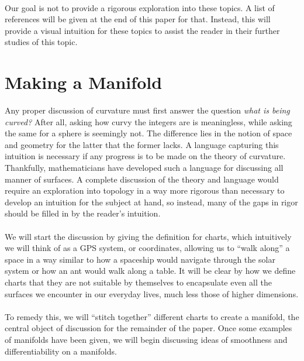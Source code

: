 \documentclass[]{article}
\newcommand\<{\ensuremath{\left\langle}}
\renewcommand\>{\ensuremath{\right\rangle}}
\theoremstyle{definition}
\theoremstyle{definition}
\begin{document}
	\\
	Our goal is not to provide a rigorous exploration into these topics. A list of references will be given at the end of this paper for that. Instead, this will provide a visual intuition for these topics to assist the reader in their further studies of this topic. 
	\newpage
	\section{Making a Manifold}
	Any proper discussion of curvature must first answer the question \textit{what is being curved?} After all, asking how curvy the integers are is meaningless, while asking the same for a sphere is seemingly not. The difference lies in the notion of space and geometry for the latter that the former lacks. A language capturing this intuition is necessary if any progress is to be made on the theory of curvature. Thankfully, mathematicians have developed such a language for discussing all manner of surfaces. A complete discussion of the theory and language would require an exploration into topology in a way more rigorous than necessary to develop an intuition for the subject at hand, so instead, many of the gaps in rigor should be filled in by the reader's intuition.\\
	\\
	We will start the discussion by giving the definition for charts, which intuitively we will think of as a GPS system, or coordinates, allowing us to ``walk along'' a space in a way similar to how a spaceship would navigate through the solar system or how an ant would walk along a table. It will be clear by how we define charts that they are not suitable by themselves to encapsulate even all the surfaces we encounter in our everyday lives, much less those of higher dimensions. \\
	\\
	To remedy this, we will ``stitch together'' different charts to create a manifold, the central object of discussion for the remainder of the paper. Once some examples of manifolds have been given, we will begin discussing ideas of smoothness and differentiability on a manifolds.
\end{document}
